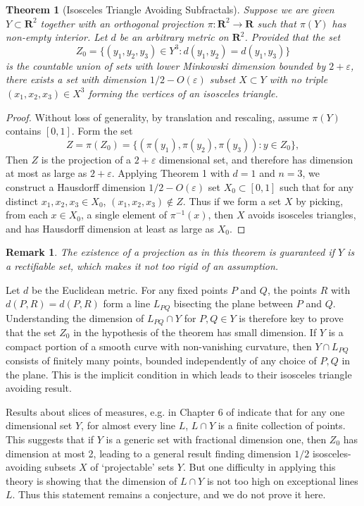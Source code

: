 \documentclass[usenames,dvipsnames]{article}
\theoremstyle{plain}
\theoremstyle{plain}
\newtheorem{theorem}{Theorem}
\newtheorem*{remark}{Remark}
\begin{document}
\begin{theorem}[Isosceles Triangle Avoiding Subfractals]
	Suppose we are given $Y \subset \mathbf{R}^2$ together with an orthogonal projection $\pi: \mathbf{R}^2 \to \mathbf{R}$ such that $\pi(Y)$ has non-empty interior. Let $d$ be an arbitrary metric on $\mathbf{R}^2$. Provided that the set
	\[ Z_0 = \{ (y_1,y_2,y_3) \in Y^3 : d(y_1,y_2) = d(y_1,y_3) \} \]
	is the countable union of sets with lower Minkowski dimension bounded by $2 + \varepsilon$, there exists a set with dimension $1/2 - O(\varepsilon)$ subset $X \subset Y$ with no triple $(x_1,x_2,x_3) \in X^3$ forming the vertices of an isosceles triangle.
\end{theorem}
\begin{proof}
	Without loss of generality, by translation and rescaling, assume $\pi(Y)$ contains $[0,1]$. Form the set
	\[ Z = \pi(Z_0) = \{ (\pi(y_1), \pi(y_2), \pi(y_3)) : y \in Z_0 \}, \]
	Then $Z$ is the projection of a $2 + \varepsilon$ dimensional set, and therefore has dimension at most as large as $2 + \varepsilon$. Applying Theorem 1 with $d = 1$ and $n = 3$, we construct a Hausdorff dimension $1/2 - O(\varepsilon)$ set $X_0 \subset [0,1]$ such that for any distinct $x_1, x_2, x_3 \in X_0$, $(x_1, x_2, x_3) \not \in Z$. Thus if we form a set $X$ by picking, from each $x \in X_0$, a single element of $\pi^{-1}(x)$, then $X$ avoids isosceles triangles, and has Hausdorff dimension at least as large as $X_0$.
\end{proof}

\begin{remark}
	The existence of a projection as in this theorem is guaranteed if $Y$ is a rectifiable set, which makes it not too rigid of an assumption. 
\end{remark}

Let $d$ be the Euclidean metric. For any fixed points $P$ and $Q$, the points $R$ with $d(P,R) = d(P,R)$ form a line $L_{PQ}$ bisecting the plane between $P$ and $Q$. Understanding the dimension of $L_{PQ} \cap Y$ for $P,Q \in Y$ is therefore key to prove that the set $Z_0$ in the hypothesis of the theorem has small dimension. If $Y$ is a compact portion of a smooth curve with non-vanishing curvature, then $Y \cap L_{PQ}$ consists of finitely many points, bounded independently of any choice of $P,Q$ in the plane. This is the implicit condition in \cite{MalabikaRob} which leads to their isosceles triangle avoiding result.

Results about slices of measures, e.g. in Chapter 6 of \cite{Matilla} indicate that for any one dimensional set $Y$, for almost every line $L$, $L \cap Y$ is a finite collection of points. This suggests that if $Y$ is a generic set with fractional dimension one, then $Z_0$ has dimension at most 2, leading to a general result finding dimension $1/2$ isosceles-avoiding subsets $X$ of `projectable' sets $Y$. But one difficulty in applying this theory is showing that the dimension of $L \cap Y$ is not too high on exceptional lines $L$. Thus this statement remains a conjecture, and we do not prove it here.
\end{document}

